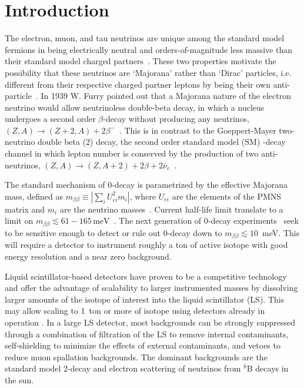 \section{Introduction}

The electron, muon, and tau neutrinos are unique among the standard
model fermions in being electrically neutral and orders-of-magnitude
less massive than their standard model charged
partners~\cite{PDG_mass}.  These two properties motivate the
possibility that these neutrinos are `Majorana' rather than `Dirac'
particles, i.e. different from their respective charged partner
leptons by being their own
anti-particle~\cite{Majorana1937,PDG_mass}. In 1939 W. Furry
pointed out that a Majorana nature of the electron neutrino would
allow neutrinoless double-beta decay, in which a nucleus undergoes a
second order $\beta$-decay without producing any neutrinos,
$(Z,A)\rightarrow(Z+2,A)+2\beta^-$~\cite{Furry1939}.  This is in
contrast to the Goeppert-Mayer two-neutrino double beta (2{\nbb})
decay, the second order standard model (SM) \bmd-decay channel in which
lepton number is conserved by the production of two anti-neutrinos,
\mbox{$(Z,A)\rightarrow(Z,A+2)+2\beta+2\bar\nu_e$}~\cite{GoeppertMayer1935}.

The standard mechanism of 0\nbb-decay is parametrized by the
effective Majorana mass, defined as
\mbox{$m_{\beta\beta}\equiv\left|\sum_i U^2_{ei}m_i\right|$}, where
$U_{ei}$ are the elements of the PMNS matrix and $m_i$ are the
neutrino masses~\cite{PDG_mass}. Current half-life limit
translate to a limit on \mbox{$m_{\beta\beta}\lesssim
61-165\,\mathrm{meV}$}~\cite{KamLANDZen2016}.  The next generation of 0\nbb-decay
experiments~\cite{NSACreport} seek to be sensitive enough to
detect or rule out 0\nbb-decay down to \mbox{$m_{\beta\beta}\lesssim
10$~meV}. This will require a detector to instrument roughly a ton of
active isotope with good energy resolution and a near zero background.

Liquid scintillator-based detectors have proven to be a competitive
technology~\cite{KamLANDZen2013} and offer the advantage of
scalability to larger instrumented masses by dissolving larger amounts
of the isotope of interest into the liquid scintillator (LS).  This
may allow scaling to 1~ton or more of isotope using detectors already
in operation \cite{Biller2013}.  In a large LS detector, most
backgrounds can be strongly suppressed through a combination of
filtration of the LS to remove internal contaminants, self-shielding
to minimize the effects of external contaminants, and vetoes to reduce
muon spallation backgrounds. The dominant backgrounds are
the standard model 2\nbb-decay and electron scattering of 
neutrinos from $^8$B decays in the sun.

